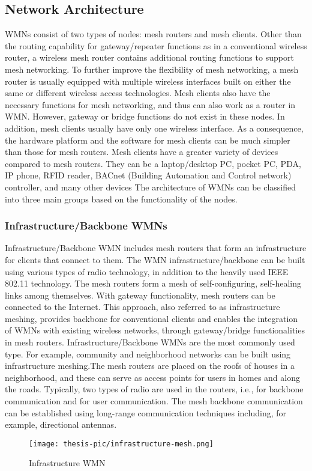 \documentclass[12pt,a4paper]{report}
\begin{document}
\subsection{Network Architecture}
WMNs consist of two types of nodes: mesh routers and mesh clients. Other than the routing
capability for gateway/repeater functions as in a conventional wireless router, a wireless mesh router contains additional routing functions to support mesh networking. To further improve the flexibility of mesh networking, a mesh router is usually equipped with multiple wireless interfaces built on either the same or different wireless access technologies. Mesh clients also have the necessary functions for mesh networking, and thus can also work as a router in WMN. However, gateway or bridge functions do not exist in these nodes. In addition, mesh clients usually have only one wireless interface. As a consequence, the hardware platform and the software for mesh clients can be much simpler than those for mesh routers. Mesh clients have a greater variety of devices compared to mesh routers. They can be a laptop/desktop PC, pocket PC, PDA, IP phone, RFID reader, BACnet (Building Automation and Control network) controller, and many other devices
The architecture of WMNs can be classified into three main groups based on the functionality of the nodes.
\subsubsection{Infrastructure/Backbone WMNs}
Infrastructure/Backbone WMN includes mesh routers that form an infrastructure for clients that connect to them. The WMN infrastructure/backbone can be built using various types of radio technology, in addition to the heavily used IEEE 802.11 technology. The mesh routers form a mesh of self-configuring, self-healing links among themselves. With gateway functionality, mesh routers can be connected to the Internet. This approach, also referred to as infrastructure meshing, provides backbone for conventional clients and enables the integration of WMNs with existing wireless networks, through gateway/bridge functionalities in mesh routers.
Infrastructure/Backbone WMNs are the most commonly used type. For example, community and neighborhood networks can be built using infrastructure meshing.The mesh routers are placed on the roofs of houses in a neighborhood, and these can serve as access points for users in homes and along the roads. Typically, two types of radio are used in the routers, i.e., for backbone communication and for user communication. The mesh backbone communication can be established using long-range communication techniques including, for example, directional antennas.
\begin{figure}[H]
\texttt{[image: thesis-pic/infrastructure-mesh.png]}
\caption{Infrastructure WMN}
\end{figure}
\end{document}
